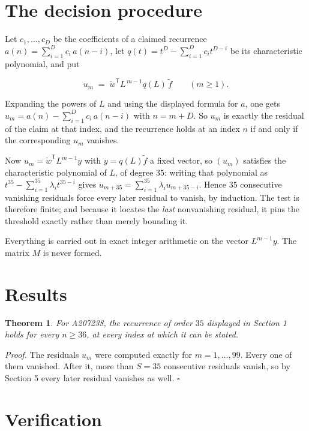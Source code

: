 \documentclass[11pt]{article}
\newtheorem{theorem}{Theorem}
\theoremstyle{definition}
\begin{document}
\section{The decision procedure}

Let $c_1,\dots,c_D$ be the coefficients of a claimed recurrence $a(n) = \sum_{i=1}^{D} c_i\,a(n-i)$, let $q(t) = t^{D} - \sum_{i=1}^{D} c_i t^{D-i}$ be its characteristic polynomial, and put

\[u_m \;=\; \tilde w^{\mathsf T} L^{\,m-1} q(L)\,\tilde f \qquad (m \ge 1).\]

Expanding the powers of $L$ and using the displayed formula for $a$, one gets $u_m = a(n) - \sum_{i=1}^{D} c_i\,a(n-i)$ with $n = m + D$. So $u_m$ is exactly the residual of the claim at that index, and the recurrence holds at an index $n$ if and only if the corresponding $u_m$ vanishes.

Now $u_m = \tilde w^{\mathsf T} L^{m-1} y$ with $y = q(L)\tilde f$ a fixed vector, so $(u_m)$ satisfies the characteristic polynomial of $L$, of degree $35$: writing that polynomial as $t^{35} - \sum_{i=1}^{35} \lambda_i t^{35-i}$ gives $u_{m+35} = \sum_{i=1}^{35} \lambda_i u_{m+35-i}$. Hence $35$ consecutive vanishing residuals force every later residual to vanish, by induction. The test is therefore finite; and because it locates the {\itshape last} nonvanishing residual, it pins the threshold exactly rather than merely bounding it.

Everything is carried out in exact integer arithmetic on the vector $L^{m-1}y$. The matrix $M$ is never formed.

\section{Results}

\begin{theorem} For A207238, the recurrence of order $35$ displayed in Section 1 holds for every $n \ge 36$, at every index at which it can be stated.\end{theorem}

{\itshape Proof.} The residuals $u_m$ were computed exactly for $m = 1,\dots,99$. Every one of them vanished. After it, more than $S = 35$ consecutive residuals vanish, so by Section 5 every later residual vanishes as well. $\square$

\section{Verification}
\end{document}
